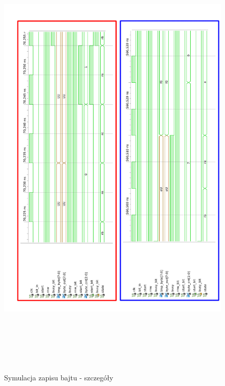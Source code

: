 \documentclass[a4paper]{article}
\begin{document}
\begin{figure}[H]
\begin{center}
\includegraphics[height=22cm]{graphics/byte_module_symulation2.png}
\end{center}
\caption{Symulacja zapisu bajtu - szczegóły}
\label{byte_module_symulation2}
\end{figure}
\end{document}
